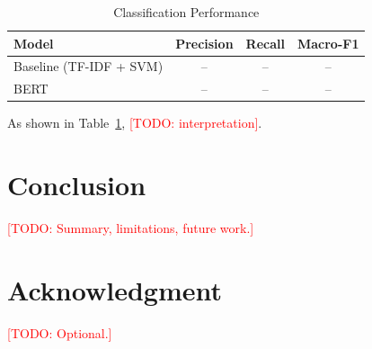 \documentclass[conference]{IEEEtran}
\newcommand{\todo}[1]{\textcolor{red}{[TODO: #1]}}
\begin{document}
\begin{table}[htbp]
\caption{Classification Performance}
\label{tab:results}
\centering
\begin{tabular}{lccc}
\toprule
Model & Precision & Recall & Macro-F1 \\
\midrule
Baseline (TF-IDF + SVM) & -- & -- & -- \\
BERT & -- & -- & -- \\
\bottomrule
\end{tabular}
\end{table}

As shown in Table~\ref{tab:results}, \todo{interpretation}.


\section{Conclusion}
\todo{Summary, limitations, future work.}

\section*{Acknowledgment}
\todo{Optional.}



\end{document}
